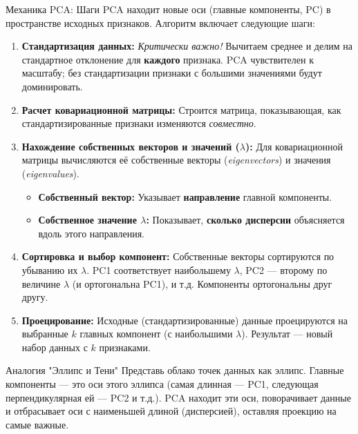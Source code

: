 \begin{textbox}{Механика PCA: Шаги}
    PCA находит новые оси (главные компоненты, PC) в пространстве исходных признаков. Алгоритм включает следующие шаги:
    \begin{enumerate}[nosep, itemsep=0.5ex] %
        \item \textbf{Стандартизация данных:} \textit{Критически важно!} Вычитаем среднее и делим на стандартное отклонение для \textbf{каждого} признака. PCA чувствителен к масштабу; без стандартизации признаки с большими значениями будут доминировать.
        \item \textbf{Расчет ковариационной матрицы:} Строится матрица, показывающая, как стандартизированные признаки изменяются \textit{совместно}.
        \item \textbf{Нахождение собственных векторов и значений ($\lambda$):} Для ковариационной матрицы вычисляются её собственные векторы (\textit{eigenvectors}) и значения (\textit{eigenvalues}).
            \begin{itemize}[nosep, leftmargin=1.5em] %
                \item \textbf{Собственный вектор:} Указывает \textbf{направление} главной компоненты.
                \item \textbf{Собственное значение $\lambda$:} Показывает, \textbf{сколько дисперсии} объясняется вдоль этого направления.
            \end{itemize}
        \item \textbf{Сортировка и выбор компонент:} Собственные векторы сортируются по убыванию их $\lambda$. PC1 соответствует наибольшему $\lambda$, PC2 — второму по величине $\lambda$ (и ортогональна PC1), и т.д. Компоненты ортогональны друг другу.
        \item \textbf{Проецирование:} Исходные (стандартизированные) данные проецируются на выбранные $k$ главных компонент (с наибольшими $\lambda$). Результат — новый набор данных с $k$ признаками.
    \end{enumerate}
\end{textbox}

\begin{myexampleblock}{Аналогия "Эллипс и Тени"}
    Представь облако точек данных как эллипс. Главные компоненты — это оси этого эллипса (самая длинная — PC1, следующая перпендикулярная ей — PC2 и т.д.). PCA находит эти оси, поворачивает данные и отбрасывает оси с наименьшей длиной (дисперсией), оставляя проекцию на самые важные.
\end{myexampleblock}

